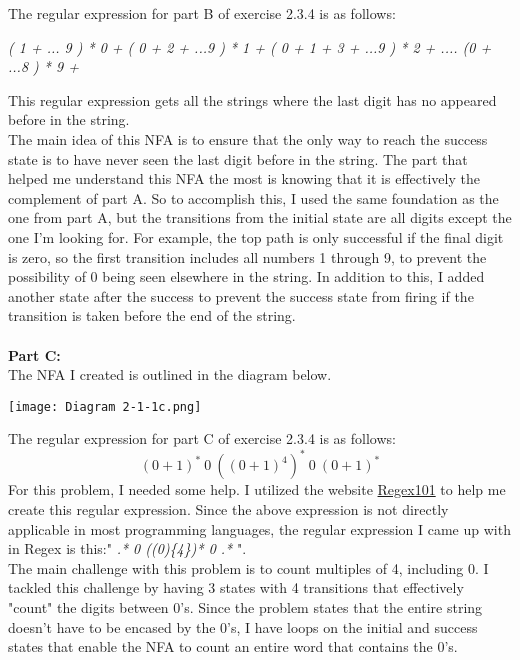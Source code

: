 \documentclass{article}
\theoremstyle{theorem}
\theoremstyle{definition}
\theoremstyle{remark}
\begin{document}
The regular expression for part B of exercise 2.3.4 is as follows:
\begin{center}
    \textit{( 1 + ... 9 ) * 0  + ( 0 + 2 + ...9 ) * 1 + ( 0 + 1 + 3 + ...9 ) * 2 + .... (0 + ...8 ) * 9 + \textepsilon }
\end{center}
This regular expression gets all the strings where the last digit has no appeared before in the string.
\\
The main idea of this NFA is to ensure that the only way to reach the success state is to have never seen the last digit before in the string.
The part that helped me understand this NFA the most is knowing that it is effectively the complement of part A. 
So to accomplish this, I used the same foundation as the one from part A, but the transitions from the initial state are all digits except the one I'm looking for. For example, the top path is only successful if the final digit is zero, so the first transition includes all numbers 1 through 9, to prevent the possibility of 0 being seen elsewhere in the string. In addition to this, I added another state after the success to prevent the success state from firing if the transition is taken before the end of the string.\\
\\
\textbf{Part C:}\\
The NFA I created is outlined in the diagram below.
\begin{center}
    \texttt{[image: Diagram 2-1-1c.png]}
\end{center}
The regular expression for part C of exercise 2.3.4 is as follows:
\begin{equation}
    (0+1)^*\ 0\ ((0+1)^4)^*\ 0\ (0+1)^*
\end{equation}
For this problem, I needed some help. I utilized the website \href{https://regex101.com/}{Regex101} to help me create this regular expression. Since the above expression is not directly applicable in most programming languages, the regular expression I came up with in Regex is this:" \textit{.* 0 ((0)\{4\})* 0 .*} ".
\\
The main challenge with this problem is to count multiples of 4, including 0. 
I tackled this challenge by having 3 states with 4 transitions that effectively "count" the digits between 0's.
Since the problem states that the entire string doesn't have to be encased by the 0's, I have loops on the initial and success states that enable the NFA to count an entire word that contains the 0's.\\
\end{document}
